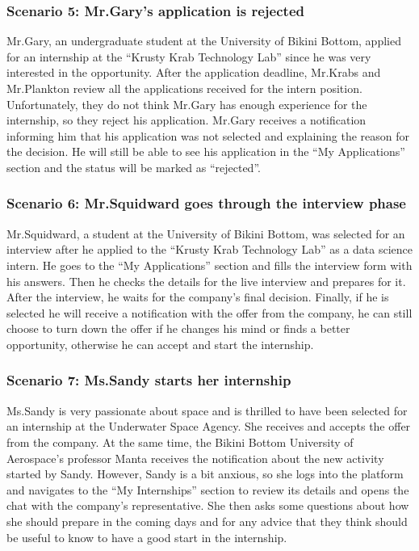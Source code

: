\subsubsection{Scenario 5: Mr.Gary's application is rejected}\label{subsubsec:scenario_5}
Mr.Gary, an undergraduate student at the University of Bikini Bottom, applied for an internship at the ``Krusty Krab Technology Lab'' since he was very 
interested in the opportunity. After the application deadline, Mr.Krabs and Mr.Plankton review all the applications received for the intern 
position. Unfortunately, they do not think Mr.Gary has enough experience for the internship, so they reject his application. Mr.Gary receives a 
notification informing him that his application was not selected and explaining the reason for the decision. He will still be able to see his application 
in the ``My Applications'' section and the status will be marked as ``rejected''.

\subsubsection{Scenario 6: Mr.Squidward goes through the interview phase}\label{subsubsec:scenario_6}
Mr.Squidward, a student at the University of Bikini Bottom, was selected for an interview after he applied to the ``Krusty Krab Technology 
Lab'' as a data science intern. He goes to the ``My Applications'' section and fills the interview form with his answers. Then he checks the details for the 
live interview and prepares for it. After the interview, he waits for the company's final decision. Finally, if he is selected he will receive a notification 
with the offer from the company, he can still choose to turn down the offer if he changes his mind or finds a better opportunity, otherwise he can accept and
start the internship.

\subsubsection{Scenario 7: Ms.Sandy starts her internship}\label{subsubsec:scenario_7}
Ms.Sandy is very passionate about space and is thrilled to have been selected for an internship at the Underwater Space Agency. She receives 
and accepts the offer from the company. At the same time, the Bikini Bottom University of Aerospace's professor Manta receives the notification
about the new activity started by Sandy. However, Sandy is a bit anxious, so she logs into the platform and navigates to the ``My Internships'' 
section to review its details and opens the chat with the company's representative. She then asks some questions about how she should prepare in the 
coming days and for any advice that they think should be useful to know to have a good start in the internship.

